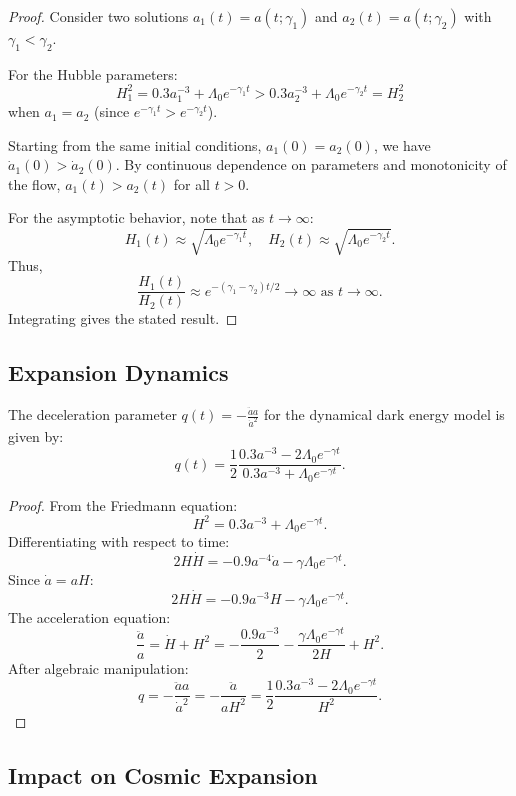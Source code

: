 \begin{proof}
Consider two solutions $a_1(t) = a(t;\gamma_1)$ and $a_2(t) = a(t;\gamma_2)$ with $\gamma_1 < \gamma_2$. 

For the Hubble parameters:
\[
H_1^2 = 0.3 a_1^{-3} + \Lambda_0 e^{-\gamma_1 t} > 0.3 a_2^{-3} + \Lambda_0 e^{-\gamma_2 t} = H_2^2
\]
when $a_1 = a_2$ (since $e^{-\gamma_1 t} > e^{-\gamma_2 t}$).

Starting from the same initial conditions, $a_1(0) = a_2(0)$, we have $\dot{a}_1(0) > \dot{a}_2(0)$. By continuous dependence on parameters and monotonicity of the flow, $a_1(t) > a_2(t)$ for all $t > 0$.

For the asymptotic behavior, note that as $t \to \infty$:
\[
H_1(t) \approx \sqrt{\Lambda_0 e^{-\gamma_1 t}}, \quad H_2(t) \approx \sqrt{\Lambda_0 e^{-\gamma_2 t}}.
\]
Thus,
\[
\frac{H_1(t)}{H_2(t)} \approx e^{-(\gamma_1-\gamma_2)t/2} \to \infty \text{ as } t \to \infty.
\]
Integrating gives the stated result.
\end{proof}

\subsection{Expansion Dynamics}

\begin{lemma}
The deceleration parameter $q(t) = -\frac{\ddot{a}a}{\dot{a}^2}$ for the dynamical dark energy model is given by:
\[
q(t) = \frac{1}{2}\frac{0.3 a^{-3} - 2\Lambda_0 e^{-\gamma t}}{0.3 a^{-3} + \Lambda_0 e^{-\gamma t}}.
\]
\end{lemma}

\begin{proof}
From the Friedmann equation:
\[
H^2 = 0.3 a^{-3} + \Lambda_0 e^{-\gamma t}.
\]
Differentiating with respect to time:
\[
2H\dot{H} = -0.9 a^{-4}\dot{a} - \gamma \Lambda_0 e^{-\gamma t}.
\]
Since $\dot{a} = aH$:
\[
2H\dot{H} = -0.9 a^{-3}H - \gamma \Lambda_0 e^{-\gamma t}.
\]
The acceleration equation:
\[
\frac{\ddot{a}}{a} = \dot{H} + H^2 = -\frac{0.9 a^{-3}}{2} - \frac{\gamma \Lambda_0 e^{-\gamma t}}{2H} + H^2.
\]
After algebraic manipulation:
\[
q = -\frac{\ddot{a}a}{\dot{a}^2} = -\frac{\ddot{a}}{aH^2} = \frac{1}{2}\frac{0.3 a^{-3} - 2\Lambda_0 e^{-\gamma t}}{H^2}.
\]
\end{proof}

\subsection{Impact on Cosmic Expansion}

